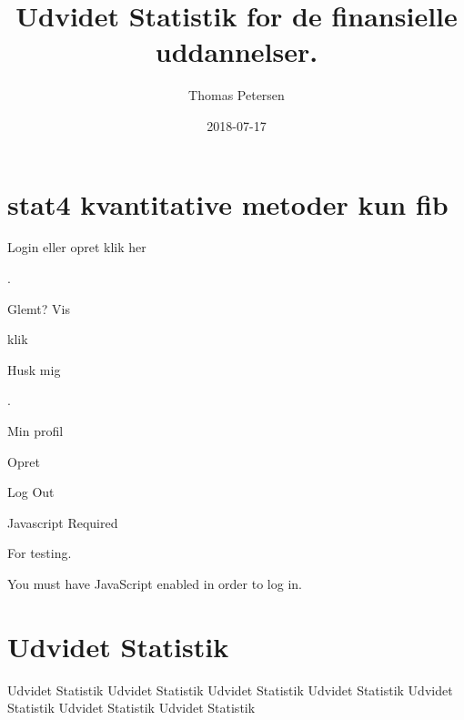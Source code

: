 \documentclass[]{book}
\title{Udvidet Statistik for de finansielle uddannelser.}
\author{Thomas Petersen}
\date{2018-07-17}
\theoremstyle{definition}
\theoremstyle{definition}
\theoremstyle{definition}
\theoremstyle{remark}
\begin{document}
\maketitle

{
\setcounter{tocdepth}{1}
\tableofcontents
}
\hypertarget{stat4-kvantitative-metoder-kun-fib}{%
\chapter*{stat4 kvantitative metoder kun
fib}\label{stat4-kvantitative-metoder-kun-fib}}

\hypertarget{Settings}{}

\hypertarget{TopBar}{}
\hypertarget{Sentry_label}{}
\protect\hypertarget{Sentry_label_span}{}{Login eller opret klik her}

\hypertarget{magicGroup}{}
\hypertarget{messages}{}
.

\hypertarget{Sentry_emailDiv}{}
{ }

\hypertarget{Sentry_passwordDiv}{}
{ }

\hypertarget{Sentry_HIDpasswordDiv}{}
{ }

\hypertarget{unHideDiv}{}
\protect\hypertarget{forgotSpan}{}{Glemt?}
\protect\hypertarget{unHideSpan}{}{Vis}

\hypertarget{buttonDiv}{}
klik

\hypertarget{psistDiv}{}
 \protect\hypertarget{psistSpan}{}{Husk mig}

\hypertarget{goInside}{}
\protect\hypertarget{goInsideSpan}{}{.}

\hypertarget{myProfile}{}
Min profil

\hypertarget{Tilmeld}{}
Opret

\hypertarget{logOut}{}
{Log Out}

\hypertarget{xbox}{}

\hypertarget{Sentry_noJSLogin}{}
{Javascript Required}

\hypertarget{Sentry_loggingIn}{}

\hypertarget{Sentry_In}{}
For testing.

You must have JavaScript enabled in order to log in.

\hypertarget{udvidet-statistik}{%
\chapter{Udvidet Statistik}\label{udvidet-statistik}}

Udvidet Statistik Udvidet Statistik Udvidet Statistik Udvidet Statistik
Udvidet Statistik Udvidet Statistik Udvidet Statistik
\end{document}
